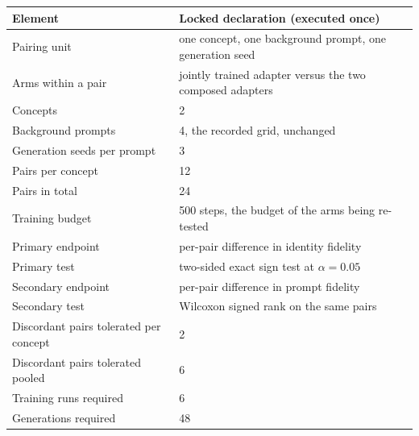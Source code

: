 \begin{tabular}{ll}
\toprule
Element & Locked declaration (executed once) \\
\midrule
Pairing unit & one concept, one background prompt, one generation seed \\
Arms within a pair & jointly trained adapter versus the two composed adapters \\
Concepts & 2 \\
Background prompts & 4, the recorded grid, unchanged \\
Generation seeds per prompt & 3 \\
Pairs per concept & 12 \\
Pairs in total & 24 \\
Training budget & 500 steps, the budget of the arms being re-tested \\
Primary endpoint & per-pair difference in identity fidelity \\
Primary test & two-sided exact sign test at $\alpha=0.05$ \\
Secondary endpoint & per-pair difference in prompt fidelity \\
Secondary test & Wilcoxon signed rank on the same pairs \\
Discordant pairs tolerated per concept & 2 \\
Discordant pairs tolerated pooled & 6 \\
Training runs required & 6 \\
Generations required & 48 \\
\bottomrule
\end{tabular}
